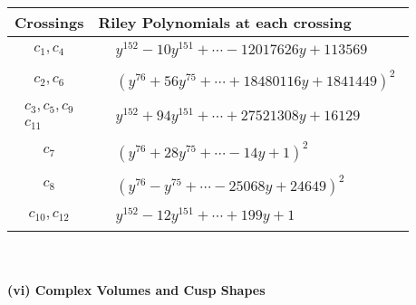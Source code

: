 \documentclass[1p]{elsarticle_modified}
\theoremstyle{definition}
\begin{document}
\begin{tabular}{m{50pt}|m{274pt}}
Crossings & \hspace{64pt}Riley Polynomials at each crossing \\
\hline $$\begin{aligned}c_{1},c_{4}\end{aligned}$$&$\begin{aligned}
&y^{152}-10 y^{151}+\cdots-12017626 y+113569
\end{aligned}$\\
\hline $$\begin{aligned}c_{2},c_{6}\end{aligned}$$&$\begin{aligned}
&(y^{76}+56 y^{75}+\cdots+18480116 y+1841449)^{2}
\end{aligned}$\\
\hline $$\begin{aligned}c_{3},c_{5},c_{9}\\c_{11}\end{aligned}$$&$\begin{aligned}
&y^{152}+94 y^{151}+\cdots+27521308 y+16129
\end{aligned}$\\
\hline $$\begin{aligned}c_{7}\end{aligned}$$&$\begin{aligned}
&(y^{76}+28 y^{75}+\cdots-14 y+1)^{2}
\end{aligned}$\\
\hline $$\begin{aligned}c_{8}\end{aligned}$$&$\begin{aligned}
&(y^{76}- y^{75}+\cdots-25068 y+24649)^{2}
\end{aligned}$\\
\hline $$\begin{aligned}c_{10},c_{12}\end{aligned}$$&$\begin{aligned}
&y^{152}-12 y^{151}+\cdots+199 y+1
\end{aligned}$\\
\hline
\end{tabular}\\~\\
\newpage\flushleft \textbf{(vi) Complex Volumes and Cusp Shapes}
\end{document}
